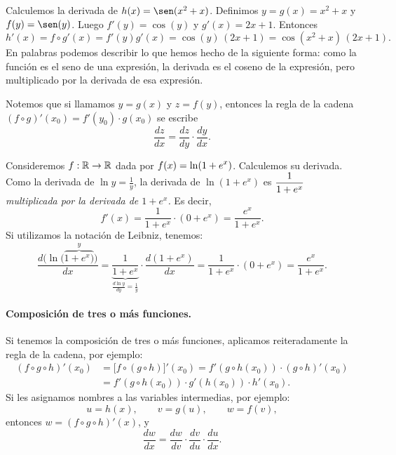 \begin{example}
    Calculemos la derivada de $h(x) = \sen(x^2+x)$. Definimos $y=g(x)=x^2+x$ y $f(y) = \sen(y)$.
    Luego $f'(y)=\cos(y)$ y $g'(x)=2x+1$. Entonces
    \[
    h'(x) = f\circ g'(x) = f'(y) g'(x) = \cos(y)\, (2x+1) = \cos(x^2+x)\, (2x+1).
    \]
    En palabras podemos describir lo que hemos hecho de la siguiente forma:
    como la función es el seno de una expresión, la derivada es el coseno de la expresión, pero multiplicado por la derivada de esa expresión.
\end{example}

\begin{remark}
    Notemos que si llamamos $y=g(x)$ y $z=f(y)$, entonces la regla de la cadena $ (f\circ g)'(x_0) = f'(y_0) \cdot g(x_0)$ se escribe
    \[
    \frac{dz}{dx} = \frac{dz}{dy}\cdot \frac{dy}{dx}.
    \]
\end{remark}

\begin{example}
    Consideremos $f:\mathbb{R}\to\mathbb{R}$ dada por $\displaystyle f(x)=\ln(1+e^x)$. Calculemos su derivada. Como la derivada de $\ln y = \frac1y$, la derivada de $\ln (1+e^x)$ es $\displaystyle \frac1{1+e^x}$ \emph{multiplicada por la derivada de $1+e^x$.} Es decir,
    \[
    f'(x) = \frac1{1+e^x}\cdot (0+e^x) = \frac{e^x}{1+e^x}.
    \]
    Si utilizamos la notación de Leibniz, tenemos:
    \[
    \frac{d \big(\ln (\overbrace{1+e^x)}^y\big)}{dx} 
    = \underbrace{\frac{1}{1+e^x}}_{\frac{d \ln y}{dy}= \frac1y} \cdot \frac{d(1+e^x)}{dx}
    = \frac1{1+e^x}\cdot (0+e^x) = \frac{e^x}{1+e^x}.
    \]
\end{example}

\paragraph{Composición de tres o más funciones.}
Si tenemos la composición de tres o más funciones, aplicamos reiteradamente la regla de la cadena, por ejemplo:
\begin{align*}
 (f\circ g\circ h)'(x_0)
 &= \big[f\circ (g\circ h)\big]'(x_0) 
 = f'(g\circ h(x_0)) \cdot (g\circ h)'(x_0)
 \\
 &= f'(g\circ h(x_0)) \cdot g'(h(x_0)) \cdot h'(x_0).
\end{align*}
Si les asignamos nombres a las variables intermedias, por ejemplo:
\[
u = h(x),\qquad v=g(u),\qquad w=f(v),
\]
entonces $w=(f\circ g\circ h)'(x)$, y 
\[
\frac{dw}{dx} = \frac{dw}{dv} \cdot \frac{dv}{du} \cdot \frac{du}{dx}.
\]


